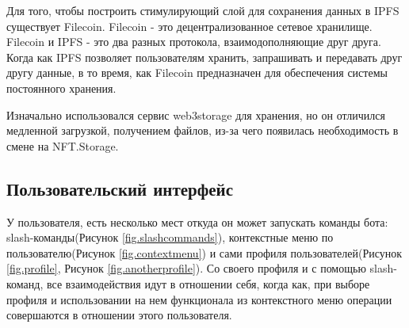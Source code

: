\begin{remark}
    Для того, чтобы построить стимулирующий слой для сохранения данных в IPFS существует Filecoin. Filecoin - это децентрализованное сетевое хранилище. Filecoin и IPFS - это два разных протокола, взаимодополняющие друг друга. Когда как IPFS позволяет пользователям хранить, запрашивать и передавать друг другу данные, в то время, как Filecoin предназначен для обеспечения системы постоянного хранения.
\end{remark}

\begin{remark}
    Изначально использовался сервис web3storage\cite{web3storage} для хранения, но он отличился медленной загрузкой, получением файлов, из-за чего появилась необходимость в смене на NFT.Storage.
\end{remark}

\subsection{Пользовательский интерфейс}

У пользователя, есть несколько мест откуда он может запускать команды бота: slash-команды(Рисунок {\color{blue} \ref{fig.slashcommands}}), контекстные меню по пользователю(Рисунок {\color{blue} \ref{fig.contextmenu}}) и сами профиля пользователей(Рисунок {\color{blue} \ref{fig.profile}}, Рисунок {\color{blue} \ref{fig.anotherprofile}}). Со своего профиля и с помощью slash-команд, все взаимодействия идут в отношении себя, когда как, при выборе профиля и использовании на нем функционала из контекстного меню операции совершаются в отношении этого пользователя.


